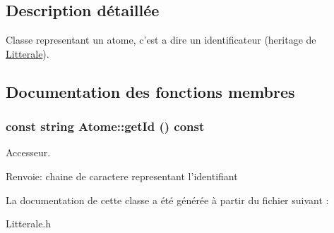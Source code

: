 \subsection{Description détaillée}
Classe representant un atome, c'est a dire un identificateur (heritage de \hyperlink{class_litterale}{Litterale}). 

\subsection{Documentation des fonctions membres}
\hypertarget{class_atome_1ea077587e5f200c22bbec3784110452}{
\subsubsection[{getId}]{\setlength{\rightskip}{0pt plus 5cm}const string Atome::getId () const}}
\label{class_atome_1ea077587e5f200c22bbec3784110452}


Accesseur. 

\begin{Desc}
\item[Renvoie:]chaine de caractere representant l'identifiant \end{Desc}


La documentation de cette classe a été générée à partir du fichier suivant :\begin{CompactItemize}
\item 
Litterale.h\end{CompactItemize}
